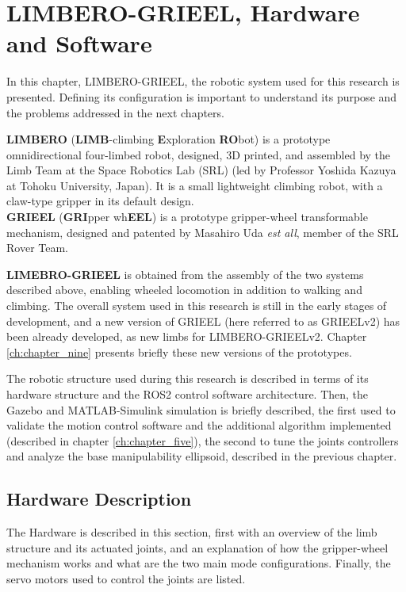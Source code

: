 \chapter{LIMBERO-GRIEEL, Hardware and Software}
\label{ch:chapter_four}%

In this chapter, LIMBERO-GRIEEL, the robotic system used for this research is presented. Defining its configuration is important to understand its purpose and the problems addressed in the next chapters. 

\textbf{LIMBERO} (\textbf{LIMB}-climbing \textbf{E}xploration \textbf{RO}bot) is a prototype omnidirectional four-limbed robot, designed, 3D printed, and assembled by the Limb Team at the Space Robotics Lab \cite{SRL}(SRL) (led by Professor Yoshida Kazuya at Tohoku University, Japan). It is a small lightweight climbing robot, with a claw-type gripper\cite{passiveSpineTohoku} in its default design.\\
\textbf{GRIEEL} (\textbf{GRI}pper wh\textbf{EEL}) is a prototype gripper-wheel transformable mechanism, designed and patented by Masahiro Uda \textit{est all}\cite{GrieelUda}\cite{GRIEELUdaThesis}, member of the SRL Rover Team.  

\textbf{LIMEBRO-GRIEEL} is obtained from the assembly of the two systems described above, enabling wheeled locomotion in addition to walking and climbing. 
The overall system used in this research is still in the early stages of development, and a new version of GRIEEL (here referred to as GRIEELv2) has been already developed, as new limbs for LIMBERO-GRIEELv2. 
Chapter \ref{ch:chapter_nine} presents briefly these new versions of the prototypes. 

The robotic structure used during this research is described in terms of its hardware structure and the ROS2 control software architecture. Then, the Gazebo and MATLAB-Simulink simulation is briefly described, the first used to validate the motion control software and the additional algorithm implemented (described in chapter \ref{ch:chapter_five}), the second to tune the joints controllers and analyze the base manipulability ellipsoid, described in the previous chapter. 

\newpage 

\section{Hardware Description}
\label{sec:hardware}

The Hardware is described in this section, first with an overview of the limb structure and its actuated joints, and an explanation of how the gripper-wheel mechanism works and what are the two main mode configurations. Finally, the servo motors used to control the joints are listed.   

